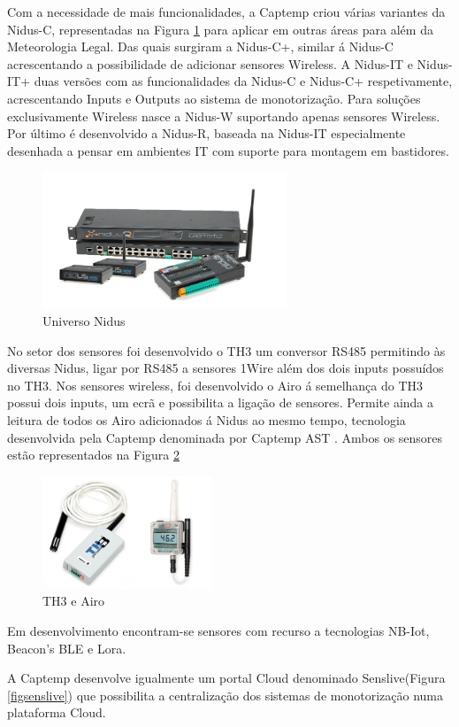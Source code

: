 Com a necessidade de mais funcionalidades, a Captemp criou várias variantes da Nidus-C, representadas na Figura \ref{fignidusall} para aplicar em outras áreas para além da Meteorologia Legal. Das quais surgiram a Nidus-C+, similar á Nidus-C acrescentando a possibilidade de adicionar sensores Wireless. A Nidus-IT e Nidus-IT+ duas versões com as funcionalidades da Nidus-C e Nidus-C+ respetivamente, acrescentando Inputs e Outputs ao sistema de monotorização. Para soluções exclusivamente Wireless nasce a Nidus-W suportando apenas sensores Wireless. Por último é desenvolvido a Nidus-R, baseada na Nidus-IT especialmente desenhada a pensar em ambientes IT com suporte para montagem em bastidores.
\par
\begin{figure}[ht]
  \centering
  \includegraphics[width=0.65\textwidth]{images/nidusall.png}
  \caption{Universo Nidus}\label{fignidusall}
\end{figure}

No setor dos sensores foi desenvolvido o TH3 um conversor RS485 permitindo às diversas Nidus, ligar por RS485 a sensores 1Wire além dos dois inputs possuídos no TH3. Nos sensores wireless, foi desenvolvido o Airo á semelhança do TH3 possui dois inputs, um ecrã e possibilita a ligação de sensores. Permite ainda a leitura de todos os Airo adicionados á Nidus ao mesmo tempo, tecnologia desenvolvida pela Captemp denominada por Captemp AST \cite{Captemp_AST}. Ambos os sensores estão representados na Figura \ref{figairoth3} 
\begin{figure}[ht]
  \centering
  \includegraphics[width=0.45\textwidth]{images/th3airo.png}
  \caption{ TH3 e Airo}\label{figairoth3}
\end{figure}
\par
Em desenvolvimento encontram-se sensores com recurso a tecnologias NB-Iot, Beacon's BLE e Lora.
\par
A Captemp desenvolve igualmente um portal Cloud denominado Senslive(Figura \ref{figsenslive}) que possibilita a centralização dos sistemas de monotorização numa plataforma Cloud.

